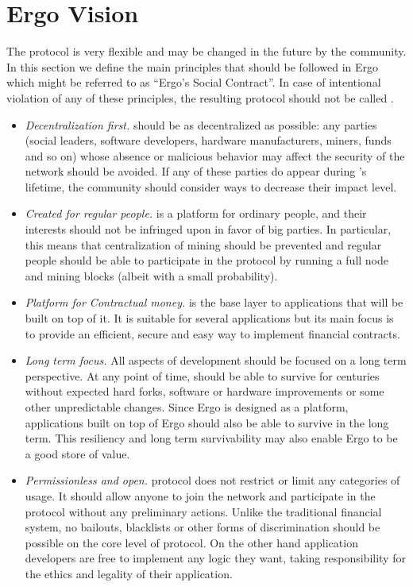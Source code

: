 \section{Ergo Vision}
\label{sec:social}


The \Ergo{} protocol is very flexible and may be changed in the future by the community.
In this section we define the main principles that should be followed in Ergo which
might be referred to as ``Ergo's Social Contract''.
In case of intentional violation of any of these principles, the resulting protocol should not
be called \Ergo{}.


\begin{itemize}
    \item{\em Decentralization first.} \Ergo{} should be as decentralized as possible: any parties (social leaders, software developers, hardware manufacturers, miners, funds and so on)
    whose absence or malicious behavior may affect the security of the network should be avoided.
    If any of these parties do appear during \Ergo{}'s lifetime, the community should consider ways to decrease their impact level.
    \item{\em Created for regular people.} \Ergo{} is a platform for ordinary people, and their interests should not be infringed upon in favor of big parties.
    In particular, this means that centralization of mining should be prevented and regular people should be able to participate in the protocol by running a full node and mining blocks (albeit with a small probability).
    \item{\em Platform for Contractual money.} \Ergo{} is the base layer to applications that will be built on top of it.
    It is suitable for several applications but its main focus is to provide an efficient, secure and easy way to implement financial contracts.
    \item{\em Long term focus.} All aspects of \Ergo{} development should be focused on a long term perspective.
    At any point of time, \Ergo{} should be able to survive for centuries without expected hard forks,
    software or hardware improvements or some other unpredictable changes.
    Since Ergo is designed as a platform, applications built on top of Ergo should also be able to survive in the long term.
    This resiliency and long term survivability may also enable Ergo to be a good store of value.
    \item{\em Permissionless and open.} \Ergo{} protocol does not restrict or limit any categories of usage.
    It should allow anyone to join the network and participate in the protocol without any preliminary actions.
    Unlike the traditional financial system, no bailouts, blacklists or other forms of discrimination should be possible
    on the core level of \Ergo{} protocol.
    On the other hand application developers are free to implement any logic they want, taking responsibility for the ethics and legality of their application.
\end{itemize}